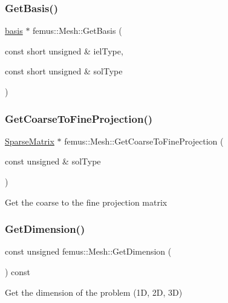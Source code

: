 \subsubsection{\texorpdfstring{Get\+Basis()}{GetBasis()}}
{\footnotesize\ttfamily \mbox{\hyperlink{classfemus_1_1basis}{basis}} $\ast$ femus\+::\+Mesh\+::\+Get\+Basis (\begin{DoxyParamCaption}\item[{const short unsigned \&}]{iel\+Type,  }\item[{const short unsigned \&}]{sol\+Type }\end{DoxyParamCaption})}

\mbox{\label{classfemus_1_1_mesh_adbe2f3cd24a35f80d8cd5adb2f5b82ac}} 
\subsubsection{\texorpdfstring{Get\+Coarse\+To\+Fine\+Projection()}{GetCoarseToFineProjection()}}
{\footnotesize\ttfamily \mbox{\hyperlink{classfemus_1_1_sparse_matrix}{Sparse\+Matrix}} $\ast$ femus\+::\+Mesh\+::\+Get\+Coarse\+To\+Fine\+Projection (\begin{DoxyParamCaption}\item[{const unsigned \&}]{sol\+Type }\end{DoxyParamCaption})}

Get the coarse to the fine projection matrix \mbox{\label{classfemus_1_1_mesh_a6f753fa456d2313d902bf184c4bb9e3b}} 
\subsubsection{\texorpdfstring{Get\+Dimension()}{GetDimension()}}
{\footnotesize\ttfamily const unsigned femus\+::\+Mesh\+::\+Get\+Dimension (\begin{DoxyParamCaption}{ }\end{DoxyParamCaption}) const\hspace{0.3cm}{\ttfamily [inline]}}

Get the dimension of the problem (1D, 2D, 3D) \mbox{\label{classfemus_1_1_mesh_a679fa1625833f437ea38d2cc651c7462}} 
